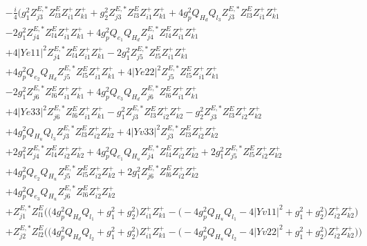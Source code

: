 \begin{align} 
 &-\frac{i}{4} \Big(g_{1}^{2} Z^{E,*}_{j 3} Z_{{l 3}}^{E} Z_{{i 1}}^{+} Z_{{k 1}}^{+} +g_{2}^{2} Z^{E,*}_{j 3} Z_{{l 3}}^{E} Z_{{i 1}}^{+} Z_{{k 1}}^{+} +4 g_{p}^{2} Q_{H_d} Q_{l_3} Z^{E,*}_{j 3} Z_{{l 3}}^{E} Z_{{i 1}}^{+} Z_{{k 1}}^{+} \nonumber \\ 
 &-2 g_{1}^{2} Z^{E,*}_{j 4} Z_{{l 4}}^{E} Z_{{i 1}}^{+} Z_{{k 1}}^{+} +4 g_{p}^{2} Q_{e_{1}} Q_{H_d} Z^{E,*}_{j 4} Z_{{l 4}}^{E} Z_{{i 1}}^{+} Z_{{k 1}}^{+} \nonumber \\ 
 &+4 |Ye11|^2 Z^{E,*}_{j 4} Z_{{l 4}}^{E} Z_{{i 1}}^{+} Z_{{k 1}}^{+} -2 g_{1}^{2} Z^{E,*}_{j 5} Z_{{l 5}}^{E} Z_{{i 1}}^{+} Z_{{k 1}}^{+} \nonumber \\ 
 &+4 g_{p}^{2} Q_{e_{2}} Q_{H_d} Z^{E,*}_{j 5} Z_{{l 5}}^{E} Z_{{i 1}}^{+} Z_{{k 1}}^{+} +4 |Ye22|^2 Z^{E,*}_{j 5} Z_{{l 5}}^{E} Z_{{i 1}}^{+} Z_{{k 1}}^{+} \nonumber \\ 
 &-2 g_{1}^{2} Z^{E,*}_{j 6} Z_{{l 6}}^{E} Z_{{i 1}}^{+} Z_{{k 1}}^{+} +4 g_{p}^{2} Q_{e_3} Q_{H_d} Z^{E,*}_{j 6} Z_{{l 6}}^{E} Z_{{i 1}}^{+} Z_{{k 1}}^{+} \nonumber \\ 
 &+4 |Ye33|^2 Z^{E,*}_{j 6} Z_{{l 6}}^{E} Z_{{i 1}}^{+} Z_{{k 1}}^{+} - g_{1}^{2} Z^{E,*}_{j 3} Z_{{l 3}}^{E} Z_{{i 2}}^{+} Z_{{k 2}}^{+} - g_{2}^{2} Z^{E,*}_{j 3} Z_{{l 3}}^{E} Z_{{i 2}}^{+} Z_{{k 2}}^{+} \nonumber \\ 
 &+4 g_{p}^{2} Q_{H_u} Q_{l_3} Z^{E,*}_{j 3} Z_{{l 3}}^{E} Z_{{i 2}}^{+} Z_{{k 2}}^{+} +4 |Yv33|^2 Z^{E,*}_{j 3} Z_{{l 3}}^{E} Z_{{i 2}}^{+} Z_{{k 2}}^{+} \nonumber \\ 
 &+2 g_{1}^{2} Z^{E,*}_{j 4} Z_{{l 4}}^{E} Z_{{i 2}}^{+} Z_{{k 2}}^{+} +4 g_{p}^{2} Q_{e_{1}} Q_{H_u} Z^{E,*}_{j 4} Z_{{l 4}}^{E} Z_{{i 2}}^{+} Z_{{k 2}}^{+} +2 g_{1}^{2} Z^{E,*}_{j 5} Z_{{l 5}}^{E} Z_{{i 2}}^{+} Z_{{k 2}}^{+} \nonumber \\ 
 &+4 g_{p}^{2} Q_{e_{2}} Q_{H_u} Z^{E,*}_{j 5} Z_{{l 5}}^{E} Z_{{i 2}}^{+} Z_{{k 2}}^{+} +2 g_{1}^{2} Z^{E,*}_{j 6} Z_{{l 6}}^{E} Z_{{i 2}}^{+} Z_{{k 2}}^{+} \nonumber \\ 
 &+4 g_{p}^{2} Q_{e_3} Q_{H_u} Z^{E,*}_{j 6} Z_{{l 6}}^{E} Z_{{i 2}}^{+} Z_{{k 2}}^{+} \nonumber \\ 
 &+Z^{E,*}_{j 1} Z_{{l 1}}^{E} \Big(\Big(4 g_{p}^{2} Q_{H_d} Q_{l_1}  + g_{1}^{2} + g_{2}^{2}\Big)Z_{{i 1}}^{+} Z_{{k 1}}^{+}  - \Big(-4 g_{p}^{2} Q_{H_u} Q_{l_1}  -4 |Yv11|^2  + g_{1}^{2} + g_{2}^{2}\Big)Z_{{i 2}}^{+} Z_{{k 2}}^{+} \Big)\nonumber \\ 
 &+Z^{E,*}_{j 2} Z_{{l 2}}^{E} \Big(\Big(4 g_{p}^{2} Q_{H_d} Q_{l_2}  + g_{1}^{2} + g_{2}^{2}\Big)Z_{{i 1}}^{+} Z_{{k 1}}^{+}  - \Big(-4 g_{p}^{2} Q_{H_u} Q_{l_2}  -4 |Yv22|^2  + g_{1}^{2} + g_{2}^{2}\Big)Z_{{i 2}}^{+} Z_{{k 2}}^{+} \Big)\Big)\end{align} 
